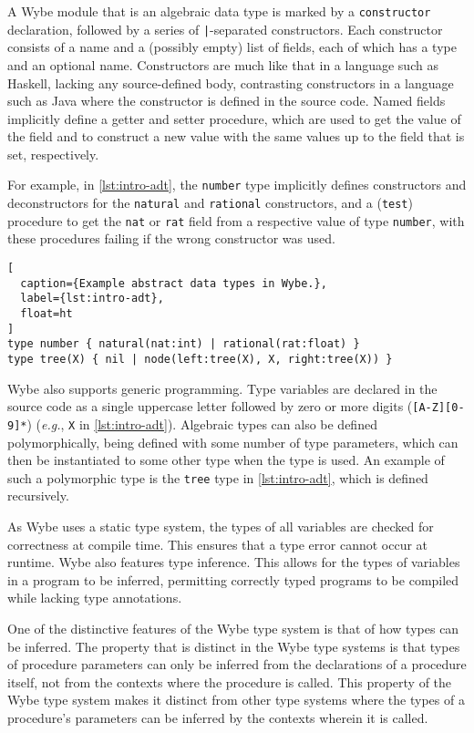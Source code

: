 A Wybe module that is an algebraic data type is marked by a \texttt{constructor} declaration, followed by a series of \texttt{|}-separated constructors. Each constructor consists of a name and a (possibly empty) list of fields, each of which has a type and an optional name. Constructors are much like that in a language such as Haskell, lacking any source-defined body, contrasting constructors in a language such as Java where the constructor is defined in the source code. Named fields implicitly define a getter and setter procedure, which are used to get the value of the field and to construct a new value with the same values up to the field that is set, respectively. 

For example, in \cref{lst:intro-adt}, the \texttt{number} type implicitly defines constructors and deconstructors for the \texttt{natural} and \texttt{rational} constructors, and a (\texttt{test}) procedure to get the \texttt{nat} or \texttt{rat} field from a respective value of type \texttt{number}, with these procedures failing if the wrong constructor was used.

\begin{lstlisting}[
  caption={Example abstract data types in Wybe.},
  label={lst:intro-adt},
  float=ht
]
type number { natural(nat:int) | rational(rat:float) }
type tree(X) { nil | node(left:tree(X), X, right:tree(X)) }
\end{lstlisting}

Wybe also supports generic programming. Type variables are declared in the source code as a single uppercase letter followed by zero or more digits (\texttt{[A-Z][0-9]*}) (\textit{e.g.}, \texttt{X} in \cref{lst:intro-adt}). Algebraic types can also be defined polymorphically, being defined with some number of type parameters, which can then be instantiated to some other type when the type is used. An example of such a polymorphic type is the \texttt{tree} type in \cref{lst:intro-adt}, which is defined recursively.

As Wybe uses a static type system, the types of all variables are checked for correctness at compile time. This ensures that a type error cannot occur at runtime. Wybe also features type inference. This allows for the types of variables in a program to be inferred, permitting correctly typed programs to be compiled while lacking type annotations.

One of the distinctive features of the Wybe type system is that of how types can be inferred. The property that is distinct in the Wybe type systems is that types of procedure parameters can only be inferred from the declarations of a procedure itself, not from the contexts where the procedure is called. This property of the Wybe type system makes it distinct from other type systems where the types of a procedure's parameters can be inferred by the contexts wherein it is called. 


